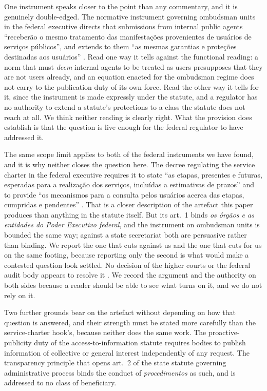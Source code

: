 One instrument speaks closer to the point than any commentary, and it is genuinely
double-edged. The normative instrument governing ombudsman units in the federal executive
directs that submissions from internal public agents ``receber\~ao o mesmo tratamento das
manifesta\c{c}\~oes provenientes de usu\'arios de servi\c{c}os p\'ublicos'', and extends to
them ``as mesmas garantias e prote\c{c}\~oes destinadas aos usu\'arios''
\citep{brcgu2024portaria116}. Read one way it tells against the functional reading: a norm that
must \emph{deem} internal agents to be treated as users presupposes that they are not users
already, and an equation enacted for the ombudsman regime does not carry to the publication
duty of its own force. Read the other way it tells for it, since the instrument is made
expressly under the statute, and a regulator has no authority to extend a statute's protections
to a class the statute does not reach at all. We think neither reading is clearly right. What
the provision does establish is that the question is live enough for the federal regulator to
have addressed it.

The same scope limit applies to both of the federal instruments we have found, and it is why
neither closes the question here. The decree regulating the service charter in the federal
executive requires it to state ``as etapas, presentes e futuras, esperadas para a realiza\c{c}\~ao
dos servi\c{c}os, inclu\'idas a estimativas de prazos'' and to provide ``os mecanismos para a
consulta pelos usu\'arios acerca das etapas, cumpridas e pendentes''
\citep{brbrasil2017decreto9094}. That is a closer description of the artefact this paper
produces than anything in the statute itself. But its art.~1 binds \emph{os \'org\~aos e as
entidades do Poder Executivo federal}, and the instrument on ombudsman units is bounded the
same way; against a state secretariat both are persuasive rather than binding. We report the
one that cuts against us and the one that cuts for us on the same footing, because reporting
only the second is what would make a contested question look settled. No decision of the higher
courts or the federal audit body appears to resolve it \citep{brjuruena2021usuario}. We record
the argument and the authority on both sides because a reader should be able to see what turns
on it, and we do not rely on it.

Two further grounds bear on the artefact without depending on how that question is answered, and
their strength must be stated more carefully than the service-charter hook's, because neither
does the same work. The proactive-publicity duty of the access-to-information statute
\citep{brasil2011lai} requires bodies to publish information of collective or general interest
independently of any request. The transparency principle that opens art.~2 of the state statute
governing administrative process \citep{state2016procedurelaw} binds the conduct of
\emph{procedimentos} as such, and is addressed to no class of beneficiary.

